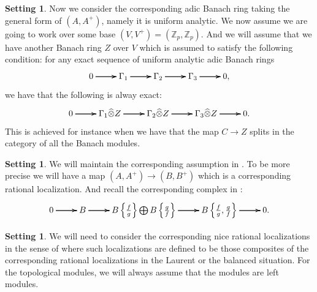 \documentclass[12pt]{amsart}
\theoremstyle{definition}
\numberwithin{equation}{section}
\newtheorem{setting}[theorem]{Setting}
\begin{document}
\begin{setting}
Now we consider the corresponding adic Banach ring taking the general form of $(A,A^+)$, namely it is uniform analytic. We now assume we are going to work over some base $(V,V^+)=(\mathbb{Z}_p,\mathbb{Z}_p)$. And we will assume that we have another Banach ring $Z$ over $V$ which is assumed to satisfy the following condition: for any exact sequence of uniform analytic adic Banach rings
\[
\xymatrix@C+0pc@R+0pc{
0 \ar[r] \ar[r] \ar[r] &\Gamma_1 \ar[r] \ar[r] \ar[r] &\Gamma_2 \ar[r] \ar[r] \ar[r] &\Gamma_3 \ar[r] \ar[r] \ar[r] &0,
}
\] 
we have that the following is alway exact:
\[
\xymatrix@C+0pc@R+0pc{
0 \ar[r] \ar[r] \ar[r] &\Gamma_1\widehat{\otimes} Z \ar[r] \ar[r] \ar[r] &\Gamma_2\widehat{\otimes} Z \ar[r] \ar[r] \ar[r] &\Gamma_3\widehat{\otimes} Z \ar[r] \ar[r] \ar[r] &0.
}
\] 
This is achieved for instance when we have that the map $C\rightarrow Z$ splits in the category of all the Banach modules.
\end{setting}


\begin{setting}
We will maintain the corresponding assumption in \cite[Hypothesis 1.7.1]{Ked2}. To be more precise we will have a map $(A,A^+)\rightarrow (B,B^+)$ which is a corresponding rational localization. And recall the corresponding complex in \cite{Ked2}:
\[
\xymatrix@C+0pc@R+0pc{
0 \ar[r] \ar[r] \ar[r] &B \ar[r] \ar[r] \ar[r] &B\left\{\frac{f}{g}\right\}\bigoplus B\left\{\frac{g}{f}\right\} \ar[r] \ar[r] \ar[r] &B\left\{\frac{f}{g},\frac{g}{f}\right\} \ar[r] \ar[r] \ar[r] &0.
}
\]	
\end{setting}




\begin{setting}
We will need to consider the corresponding nice rational localizations in the sense of \cite[Definition 1.9.1]{Ked2} where such localizations are defined to be those composites of the corresponding rational localizations in the Laurent or the balanced situation. For the topological modules, we will always assume that the modules are left modules.
\end{setting}
\end{document}
